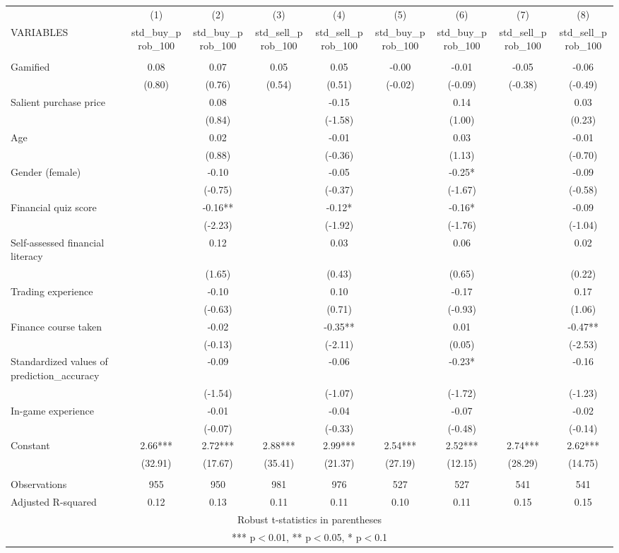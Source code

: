 \documentclass[]{article}
\begin{document}
\begin{tabular}{lcccccccc} \hline
 & (1) & (2) & (3) & (4) & (5) & (6) & (7) & (8) \\
VARIABLES & std\_buy\_prob\_100 & std\_buy\_prob\_100 & std\_sell\_prob\_100 & std\_sell\_prob\_100 & std\_buy\_prob\_100 & std\_buy\_prob\_100 & std\_sell\_prob\_100 & std\_sell\_prob\_100 \\ \hline
 &  &  &  &  &  &  &  &  \\
Gamified & 0.08 & 0.07 & 0.05 & 0.05 & -0.00 & -0.01 & -0.05 & -0.06 \\
 & (0.80) & (0.76) & (0.54) & (0.51) & (-0.02) & (-0.09) & (-0.38) & (-0.49) \\
Salient purchase price &  & 0.08 &  & -0.15 &  & 0.14 &  & 0.03 \\
 &  & (0.84) &  & (-1.58) &  & (1.00) &  & (0.23) \\
Age &  & 0.02 &  & -0.01 &  & 0.03 &  & -0.01 \\
 &  & (0.88) &  & (-0.36) &  & (1.13) &  & (-0.70) \\
Gender (female) &  & -0.10 &  & -0.05 &  & -0.25* &  & -0.09 \\
 &  & (-0.75) &  & (-0.37) &  & (-1.67) &  & (-0.58) \\
Financial quiz score &  & -0.16** &  & -0.12* &  & -0.16* &  & -0.09 \\
 &  & (-2.23) &  & (-1.92) &  & (-1.76) &  & (-1.04) \\
Self-assessed financial literacy &  & 0.12 &  & 0.03 &  & 0.06 &  & 0.02 \\
 &  & (1.65) &  & (0.43) &  & (0.65) &  & (0.22) \\
Trading experience &  & -0.10 &  & 0.10 &  & -0.17 &  & 0.17 \\
 &  & (-0.63) &  & (0.71) &  & (-0.93) &  & (1.06) \\
Finance course taken &  & -0.02 &  & -0.35** &  & 0.01 &  & -0.47** \\
 &  & (-0.13) &  & (-2.11) &  & (0.05) &  & (-2.53) \\
Standardized values of prediction\_accuracy &  & -0.09 &  & -0.06 &  & -0.23* &  & -0.16 \\
 &  & (-1.54) &  & (-1.07) &  & (-1.72) &  & (-1.23) \\
In-game experience &  & -0.01 &  & -0.04 &  & -0.07 &  & -0.02 \\
 &  & (-0.07) &  & (-0.33) &  & (-0.48) &  & (-0.14) \\
Constant & 2.66*** & 2.72*** & 2.88*** & 2.99*** & 2.54*** & 2.52*** & 2.74*** & 2.62*** \\
 & (32.91) & (17.67) & (35.41) & (21.37) & (27.19) & (12.15) & (28.29) & (14.75) \\
 &  &  &  &  &  &  &  &  \\
Observations & 955 & 950 & 981 & 976 & 527 & 527 & 541 & 541 \\
 Adjusted R-squared & 0.12 & 0.13 & 0.11 & 0.11 & 0.10 & 0.11 & 0.15 & 0.15 \\ \hline
\multicolumn{9}{c}{ Robust t-statistics in parentheses} \\
\multicolumn{9}{c}{ *** p$<$0.01, ** p$<$0.05, * p$<$0.1} \\
\end{tabular}
\end{document}
